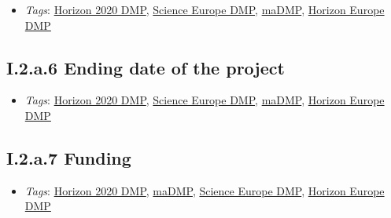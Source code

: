 \documentclass[a4paper,12pt]{report}
\begin{document}
\begin{itemize}
  \item \textit{Tags}: \ul{Horizon 2020 DMP}, \ul{Science Europe DMP}, \ul{maDMP}, \ul{Horizon Europe DMP}
  \end{itemize}





\subsection*{\protect\textcolor{colorSecId}{I.2.a.6} Ending date of the project}

\label{1e85da40-bbfc-4180-903e-6c569ed2da38.c3dabaaf-c946-4a0d-889c-ede966f97667.a14632ce-345c-48fa-8757-db609735ca1e.cabc6f07-6015-454e-b97a-c34db4ec0c60}


\begin{itemize}
  \item \textit{Tags}: \ul{Horizon 2020 DMP}, \ul{Science Europe DMP}, \ul{maDMP}, \ul{Horizon Europe DMP}
  \end{itemize}





\subsection*{\protect\textcolor{colorSecId}{I.2.a.7} Funding}

\label{1e85da40-bbfc-4180-903e-6c569ed2da38.c3dabaaf-c946-4a0d-889c-ede966f97667.a14632ce-345c-48fa-8757-db609735ca1e.36a87eac-402d-43fb-a0df-ac5963bdf87d}


\begin{itemize}
  \item \textit{Tags}: \ul{Horizon 2020 DMP}, \ul{maDMP}, \ul{Science Europe DMP}, \ul{Horizon Europe DMP}
  \end{itemize}
\end{document}
